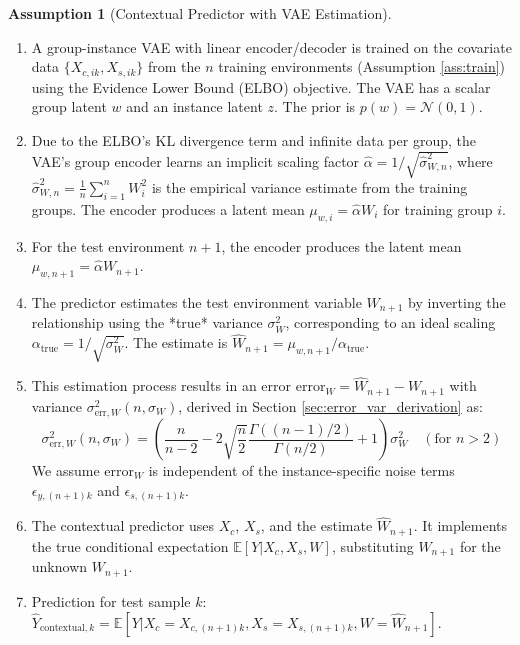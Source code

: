 \documentclass{article}
\theoremstyle{plain}
\theoremstyle{definition}
\newtheorem{assumption}{Assumption}[section]
\theoremstyle{remark}
\newcommand{\E}{\mathbb{E}}
\newcommand{\N}{\mathcal{N}} %
\newcommand{\g}{\Gamma} %
\begin{document}
\begin{assumption}[Contextual Predictor with VAE Estimation]\label{ass:contextual}
\begin{enumerate}
    \item A group-instance VAE with linear encoder/decoder is trained on the covariate data $\{X_{c,ik}, X_{s,ik}\}$ from the $n$ training environments (Assumption \ref{ass:train}) using the Evidence Lower Bound (ELBO) objective. The VAE has a scalar group latent $w$ and an instance latent $z$. The prior is $p(w)=\N(0,1)$.
    \item Due to the ELBO's KL divergence term and infinite data per group, the VAE's group encoder learns an implicit scaling factor $\hat{\alpha} = 1 / \sqrt{\hat{\sigma}_{W,n}^2}$, where $\hat{\sigma}_{W,n}^2 = \frac{1}{n}\sum_{i=1}^n W_i^2$ is the empirical variance estimate from the training groups. The encoder produces a latent mean $\mu_{w,i} = \hat{\alpha} W_i$ for training group $i$.
    \item For the test environment $n+1$, the encoder produces the latent mean $\mu_{w, n+1} = \hat{\alpha} W_{n+1}$.
    \item The predictor estimates the test environment variable $W_{n+1}$ by inverting the relationship using the *true* variance $\sigma_W^2$, corresponding to an ideal scaling $\alpha_{\text{true}} = 1/\sqrt{\sigma_W^2}$. The estimate is $\hat{W}_{n+1} = \mu_{w, n+1} / \alpha_{\text{true}}$.
    \item This estimation process results in an error $\text{error}_W = \hat{W}_{n+1} - W_{n+1}$ with variance $\sigma_{\text{err},W}^2(n, \sigma_W)$, derived in Section \ref{sec:error_var_derivation} as:
    \[ \sigma_{\text{err},W}^2(n, \sigma_W) = \left( \frac{n}{n-2} - 2 \sqrt{\frac{n}{2}} \frac{\g((n-1)/2)}{\g(n/2)} + 1 \right) \sigma_W^2 \quad (\text{for } n>2) \]
    We assume $\text{error}_W$ is independent of the instance-specific noise terms $\epsilon_{y,(n+1)k}$ and $\epsilon_{s,(n+1)k}$.
    \item The contextual predictor uses $X_c$, $X_s$, and the estimate $\hat{W}_{n+1}$. It implements the true conditional expectation $\E[Y | X_c, X_s, W]$, substituting $\hat{W}_{n+1}$ for the unknown $W_{n+1}$.
    \item Prediction for test sample $k$: $\hat{Y}_{\text{contextual}, k} = \E[Y | X_c=X_{c,(n+1)k}, X_s=X_{s,(n+1)k}, W=\hat{W}_{n+1}]$.
\end{enumerate}
\end{assumption}
\end{document}
